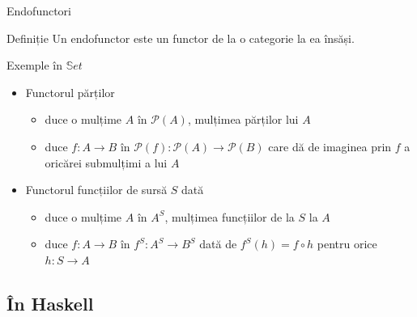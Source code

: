 \documentclass[xcolor=pdftex,romanian,colorlinks]{beamer}
\begin{document}
\begin{frame}{Endofunctori}
\begin{block}{Definiție}
Un endofunctor este un functor de la o categorie la ea însăși.
\end{block}

\begin{block}{Exemple în $\mathbb{S}et$}
\begin{itemize}
\item Functorul părților
\begin{itemize}
\item duce o mulțime $A$ în $\mathcal{P}(A)$, mulțimea părților lui $A$
\item duce $f : A \rightarrow B$ în $\mathcal{P}(f) : \mathcal{P}(A) \rightarrow \mathcal{P}(B)$ care dă de imaginea prin $f$ a oricărei submulțimi a lui $A$
\end{itemize}
\item Functorul funcțiilor de sursă $S$ dată 
\begin{itemize}
\item duce o mulțime $A$ în $A^S$, mulțimea funcțiilor de la $S$ la $A$
\item duce $f : A \rightarrow B$ în $f^S : A^S \rightarrow B^S$ dată de 
$f^S(h) = f \circ h$ pentru orice $h : S \rightarrow A$
\end{itemize}

\end{itemize}
\end{block}
\end{frame}

\subsection{În Haskell}
\end{document}
